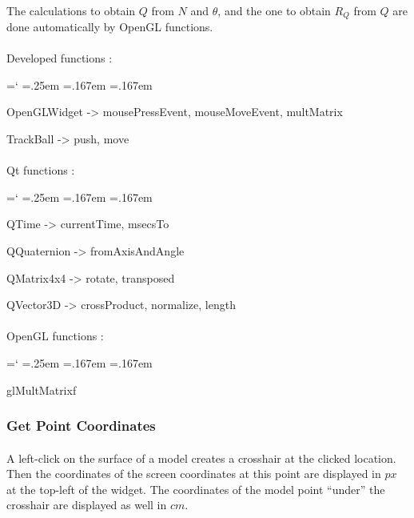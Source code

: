 \documentclass[12pt]{report}
\DeclareRobustCommand*{\ttfamily}{
  \origttfamily
  \hyphenchar\font=`\-\relax
  \fontdimen3\font=.25em\relax
  \fontdimen4\font=.167em\relax
  \fontdimen7\font=.167em\relax
}
\newenvironment{code}{\ttfamily}{}
\begin{document}
\paragraph{}
	The calculations to obtain $Q$ from $N$ and $\theta$, and the one to obtain $R_Q$ from $Q$ are done automatically by OpenGL functions.





\paragraph{}
	Developed functions :

	\begin{code}
	OpenGLWidget -> mousePressEvent, mouseMoveEvent, multMatrix
	
	TrackBall -> push, move
	\end{code}

\paragraph{}
	Qt functions :

	\begin{code}
	QTime -> currentTime, msecsTo

	QQuaternion -> fromAxisAndAngle

	QMatrix4x4 -> rotate, transposed

	QVector3D -> crossProduct, normalize, length
	\end{code}

\paragraph{}
	OpenGL functions :

	\begin{code}
	glMultMatrixf
	\end{code}


\subsubsection{Get Point Coordinates} \label{subsubsec:crosshair}
\paragraph{}
	A left-click on the surface of a model creates a crosshair at the clicked location. Then the coordinates of the screen coordinates at this point are displayed in $px$ at the top-left of the widget. The coordinates of the model point ``under'' the crosshair are displayed as well in $cm$.
\end{document}
